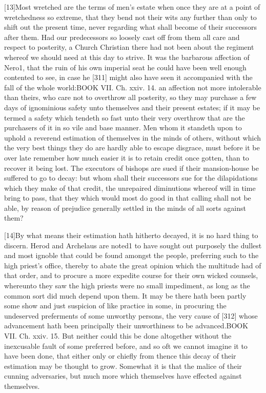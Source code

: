 [13]Most wretched are the terms of men’s estate when once they are at a point of wretchedness so extreme, that they bend not their wits any further than only to shift out the present time, never regarding what shall become of their successors after them. Had our predecessors so loosely cast off from them all care and respect to posterity, a Church Christian there had not been about the regiment whereof we should need at this day to strive. It was the barbarous affection of Nero1, that the ruin of his own imperial seat he could have been well enough contented to see, in case he [311] might also have seen it accompanied with the fall of the whole world:BOOK VII. Ch. xxiv. 14. an affection not more intolerable than theirs, who care not to overthrow all posterity, so they may purchase a few days of ignominious safety unto themselves and their present estates; if it may be termed a safety which tendeth so fast unto their very overthrow that are the purchasers of it in so vile and base manner. Men whom it standeth upon to uphold a reverend estimation of themselves in the minds of others, without which the very best things they do are hardly able to escape disgrace, must before it be over late remember how much easier it is to retain credit once gotten, than to recover it being lost. The executors of bishops are sued if their mansion-house be suffered to go to decay: but whom shall their successors sue for the dilapidations which they make of that credit, the unrepaired diminutions whereof will in time bring to pass, that they which would most do good in that calling shall not be able, by reason of prejudice generally settled in the minds of all sorts against them?

[14]By what means their estimation hath hitherto decayed, it is no hard thing to discern. Herod and Archelaus are noted1 to have sought out purposely the dullest and most ignoble that could be found amongst the people, preferring such to the high priest’s office, thereby to abate the great opinion which the multitude had of that order, and to procure a more expedite course for their own wicked counsels, whereunto they saw the high priests were no small impediment, as long as the common sort did much depend upon them. It may be there hath been partly some show and just suspicion of like practice in some, in procuring the undeserved preferments of some unworthy persons, the very cause of [312] whose advancement hath been principally their unworthiness to be advanced.BOOK VII. Ch. xxiv. 15. But neither could this be done altogether without the inexcusable fault of some preferred before, and so oft we cannot imagine it to have been done, that either only or chiefly from thence this decay of their estimation may be thought to grow. Somewhat it is that the malice of their cunning adversaries, but much more which themselves have effected against themselves.

